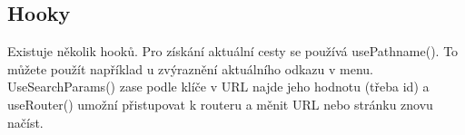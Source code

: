 \subsection*{Hooky}

Existuje několik hooků. Pro získání aktuální cesty se používá usePathname(). To můžete použít například u zvýraznění aktuálního odkazu v menu. UseSearchParams() zase podle klíče v URL najde jeho hodnotu (třeba id) a useRouter() umožní přistupovat k routeru a měnit URL nebo stránku znovu načíst.
